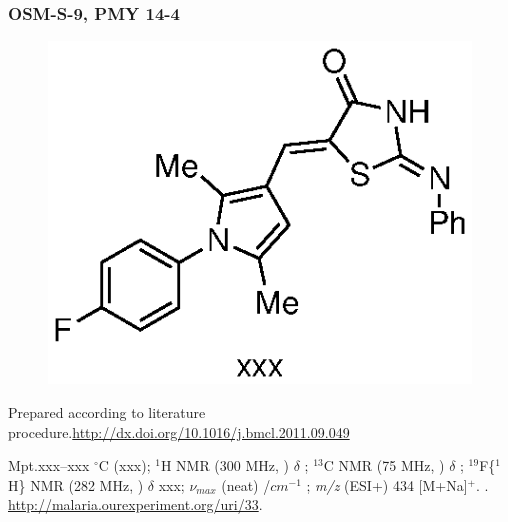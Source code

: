 \documentclass[12pt, a4paper,titlepage]{article}
\begin{document}
\subsubsection*{OSM-S-9, PMY 14-4}
\label{exp:PMY14}
	\begin{figure}[H]
	\begin{center}
	\includegraphics{exp/PMY14.eps}
	\end{center}
	\vspace{-25pt}	
	\end{figure}	

Prepared according to literature procedure.\url{http://dx.doi.org/10.1016/j.bmcl.2011.09.049}

Mpt.xxx--xxx $^\circ$C (xxx); 
$^1$H NMR (300 MHz, ) $\delta$ ; 
  $^{13}$C NMR (75 MHz, ) $\delta$ ; 
$^{19}$F\{$^1$H\} NMR (282 MHz, ) $\delta$ xxx; 
 $\nu_{max}$ (neat) /$cm^{-1}$ ; 
\emph{m/z} (ESI+) 434 [M+Na]$^+$.
. 
\url{http://malaria.ourexperiment.org/uri/33}. 
\end{document}
